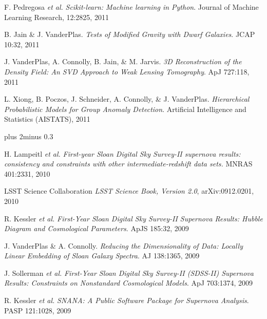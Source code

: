 \documentclass{article} %
\def\bf{\bfseries}
\def\sf{\sffamily}
\def\sl{\slshape}
\newlength\sidebarwidth
\newcommand{\smalltopic}[2]%
	 {\pagebreak[2]%
	 \vskip 1\baselineskip plus 2\baselineskip minus 0.3\baselineskip
	 \begin{minipage}{\textwidth}
         \phantomsection\addcontentsline{toc}{subsection}{#1}%
         \nopagebreak\hspace{0in}%
         \nopagebreak\begin{minipage}[t]{\sidebarwidth - .2cm}
         \raggedleft \bf\sf %
	 \textcolor{dark_blue}{\large #1}%
	 \end{minipage}%
	 \hfill
	 \begin{minipage}[t]{\linewidth - \sidebarwidth}
	 \nopagebreak{%
	    \rule{\linewidth}{.5pt}%
	    \vspace{.1\baselineskip}%
	    }%
	    #2
	 \end{minipage}
	 \end{minipage}}
\begin{document}
{\begin{itemize}[leftmargin=0ex, itemsep=0ex, parsep=.5ex, labelindent=-4ex]
    \publication
      F. Pedregosa {\sl et al.}
      {\sl Scikit-learn: Machine learning in Python}.
      Journal of Machine Learning Research, 12:2825, 2011

    \publication
      B. Jain \& J. VanderPlas.
      {\sl Tests of Modified Gravity with Dwarf Galaxies}.
      JCAP 10:32, 2011

    \publication
      J. VanderPlas, A. Connolly, B. Jain, \& M. Jarvis.
      {\sl 3D Reconstruction of the Density Field: An SVD Approach
        to Weak Lensing Tomography}.
      ApJ 727:118, 2011

    \publication
      L. Xiong, B. Poczos, J. Schneider, A. Connolly, \& J. VanderPlas.
      {\sl Hierarchical Probabilistic Models for Group Anomaly Detection}.
      Artificial Intelligence and Statistics (AISTATS), 2011
          
  \end{itemize}
}

\smalltopic{}{

  \begin{itemize}[leftmargin=0ex, itemsep=0ex, parsep=.5ex, labelindent=-4ex]


    \publication
      H. Lampeitl {\sl et al.}
      {\sl First-year Sloan Digital Sky Survey-II supernova results:
      consistency and constraints with other intermediate-redshift data sets.}
      MNRAS 401:2331, 2010

    \publication
      LSST Science Collaboration
      {\sl LSST Science Book, Version 2.0}, arXiv:0912.0201, 2010

    \publication
      R. Kessler {\it et al.}
      {\it First-Year Sloan Digital Sky Survey-II Supernova Results:
      Hubble Diagram and Cosmological Parameters}.
      ApJS 185:32, 2009

    \publication
      J. VanderPlas \& A. Connolly.
      {\it Reducing the Dimensionality of Data: Locally
      Linear Embedding of Sloan Galaxy Spectra}.
      AJ 138:1365, 2009

    \publication
      J. Sollerman {\sl et al.}
      {\it First-Year Sloan Digital Sky Survey-II (SDSS-II) Supernova
      Results: Constraints on Nonstandard Cosmological Models}.
      ApJ 703:1374, 2009

    \publication
      R. Kessler {\it et al.}
      {\it SNANA: A Public Software Package for Supernova Analysis}.
      PASP 121:1028, 2009

  \end{itemize}
}
\end{document}
